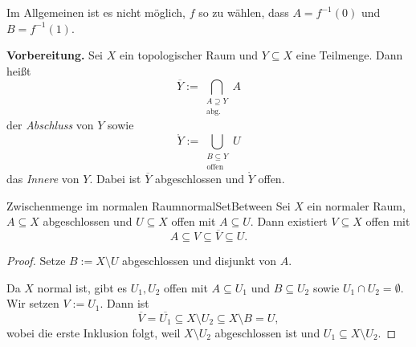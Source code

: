 \documentclass[language=ngerman]{TemplateLecture} %
\begin{document}
\begin{remark}
    Im Allgemeinen ist es nicht möglich, $f$ so zu wählen, dass $A = f^{-1}(0)$ und $B = f^{-1}(1)$.
\end{remark}

\textbf{Vorbereitung.} Sei $X$ ein topologischer Raum und $Y \subseteq X$ eine Teilmenge. Dann heißt 
\begin{equation*}
    \overline{Y} := \bigcap_{\substack{A \supseteq Y \\ \text{abg.}}} A 
\end{equation*}
der \emph{Abschluss} von $Y$ sowie
\begin{equation*}
    \mathring{Y} := \bigcup_{\substack{B \subseteq Y \\ \text{offen}}} U
\end{equation*}
das \emph{Innere} von $Y$. Dabei ist $\overline{Y}$ abgeschlossen und $\mathring{Y}$ offen.

\begin{lem}{Zwischenmenge im normalen Raum}{normalSetBetween}
    Sei $X$ ein normaler Raum, $A \subseteq X$ abgeschlossen und $U \subseteq X$ offen mit $A \subseteq U$. Dann existiert $V \subseteq X$ offen mit 
    \begin{equation*}
        A \subseteq V \subseteq \overline{V} \subseteq U.
    \end{equation*}
\end{lem}

\begin{proof}
    Setze $B := X \setminus U$ abgeschlossen und disjunkt von $A$. 

    Da $X$ normal ist, gibt es $U_1, U_2$ offen mit $A \subseteq U_1$ und $B \subseteq U_2$ sowie $U_1 \cap U_2 = \emptyset$. Wir setzen $V := U_1$. Dann ist 
    \begin{equation*}
        \overline{V} = \overline{U_1} \subseteq X \setminus U_2 \subseteq X \setminus B = U,
    \end{equation*}
    wobei die erste Inklusion folgt, weil $X \setminus U_2$ abgeschlossen ist und $U_1 \subseteq X \setminus U_2$.
\end{proof}
\end{document}
